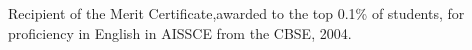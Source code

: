 \documentclass[10pt]{article}
\renewcommand{\section}[2]%
        {\pagebreak[2]\vspace{1.3\baselineskip}%
         \phantomsection\addcontentsline{toc}{section}{#1}%
         \hspace{0in}%
         \marginpar{
         \raggedright \scshape #1}#2}
\newcommand{\spc}{\vspace{1.2mm}}
\begin{document}
\spc

{Recipient of the Merit Certificate,awarded to the top 0.1\% of students, for proficiency in English in AISSCE from the CBSE, 2004.}



\end{document}
